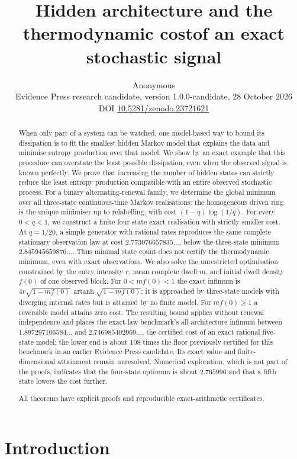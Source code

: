 \documentclass[11pt,a4paper]{article}
\title{Hidden architecture and the thermodynamic cost\newline of an exact stochastic signal}
\author{}
\date{Anonymous\\[2pt]\small Evidence Press research candidate, version 1.0.0-candidate, 28 October 2026\\\small DOI \href{https://doi.org/10.5281/zenodo.23721621}{10.5281/zenodo.23721621}}
\theoremstyle{remark}\newtheorem{remark}[theorem]{Remark}
\newcommand{\atanh}{\operatorname{artanh}}
\begin{document}
\maketitle
\thispagestyle{empty}
\begin{abstract}
When only part of a system can be watched, one model-based way to bound its
dissipation is to fit the smallest hidden Markov model that explains the data
and minimise entropy production over that model. We show by an exact
example that this procedure can overstate the least possible dissipation,
even when the observed signal is known perfectly.
We prove that increasing the number of hidden states can strictly reduce the
least entropy production compatible with an entire observed stochastic process.
For a binary alternating-renewal family, we determine the global minimum over
all three-state continuous-time Markov realisations: the homogeneous driven ring
is the unique minimiser up to relabelling, with cost $(1-q)\log(1/q)$.
For every $0<q<1$, we construct a finite four-state exact realisation with
strictly smaller cost. At $q=1/20$, a simple generator with rational rates reproduces
the same complete stationary observation law at cost
$2.773076657835\ldots$, below the three-state minimum
$2.845945659876\ldots$. Thus minimal state count does not certify the thermodynamic minimum,
even with exact observations. We also solve the unrestricted optimisation
constrained by the entry intensity $r$, mean complete dwell $m$, and initial
dwell density $f(0)$ of one observed block. For $0<mf(0)<1$ the exact infimum is
$4r\sqrt{1-mf(0)}\,\atanh\sqrt{1-mf(0)}$; it is approached by three-state
models with diverging internal rates but is attained by no finite model.
For $mf(0)\geq1$ a reversible model attains zero cost. The resulting bound
applies without renewal independence and places the exact-law benchmark's
all-architecture infimum between $1.897297106584\ldots$ and
$2.746985402969\ldots$, the certified cost of an exact rational five-state
model; the lower end is about $108$ times the floor previously certified for
this benchmark in an earlier Evidence Press candidate. Its exact value and finite-dimensional attainment
remain unresolved. Numerical exploration, which is not part of the proofs,
indicates that the four-state optimum is about $2.765996$ and that a fifth
state lowers the cost further.

All theorems have explicit proofs and
reproducible exact-arithmetic certificates.
\end{abstract}

\section{Introduction}
\end{document}
